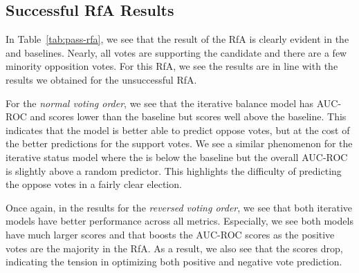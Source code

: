 \subsection{Successful RfA Results}
In Table~\ref{tab:pass-rfa}, we see that the result of the RfA is clearly evident in the \aucposPR and \aucnegPR baselines.
Nearly, all votes are supporting the candidate and there are a few minority opposition votes. 
For this RfA, we see the results are in line with the results we obtained for the unsuccessful RfA.

For the \textit{normal voting order}, we see that the iterative balance model has AUC-ROC and \aucposPR scores lower than the baseline but \aucnegPR scores well above the baseline.
This indicates that the model is better able to predict oppose votes, but at the cost of the better predictions for the support votes. 
We see a similar phenomenon for the iterative status model where the \aucposPR is below the baseline but the overall AUC-ROC is slightly above a random predictor.
This highlights the difficulty of predicting the oppose votes in a fairly clear election.

Once again, in the results for the \textit{reversed voting order}, we see that both iterative models have better performance across all metrics.
Especially, we see both models have much larger \aucposPR scores and that boosts the AUC-ROC scores as the positive votes are the majority in the RfA.
As a result, we also see that the \aucnegPR scores drop, indicating the tension in optimizing both positive and negative vote prediction.

